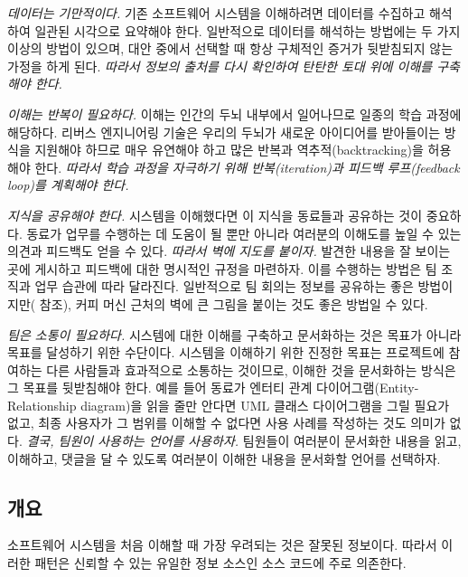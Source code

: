 \documentclass[a4paper,10pt,twoside]{book}
\begin{document}
\begin{bulletlist}
\item \emph{데이터는 기만적이다.}
기존 소프트웨어 시스템을 이해하려면 데이터를 수집하고 해석하여 일관된 시각으로 요약해야 한다. 일반적으로 데이터를 해석하는 방법에는 두 가지 이상의 방법이 있으며, 대안 중에서 선택할 때 항상 구체적인 증거가 뒷받침되지 않는 가정을 하게 된다. \emph{따라서 정보의 출처를 다시 확인하여 탄탄한 토대 위에 이해를 구축해야 한다.}

\item \emph{이해는 반복이 필요하다.}
이해는 인간의 두뇌 내부에서 일어나므로 일종의 학습 과정에 해당하다. 리버스 엔지니어링 기술은 우리의 두뇌가 새로운 아이디어를 받아들이는 방식을 지원해야 하므로 매우 유연해야 하고 많은 반복과 역추적(backtracking)을 허용해야 한다. \emph{따라서 학습 과정을 자극하기 위해 반복(iteration)과 피드백 루프(feedback loop)를 계획해야 한다.}

\item \emph{지식을 공유해야 한다.}
시스템을 이해했다면 이 지식을 동료들과 공유하는 것이 중요하다. 동료가 업무를 수행하는 데 도움이 될 뿐만 아니라 여러분의 이해도를 높일 수 있는 의견과 피드백도 얻을 수 있다. \emph{따라서 벽에 지도를 붙이자.} 발견한 내용을 잘 보이는 곳에 게시하고 피드백에 대한 명시적인 규정을 마련하자. 이를 수행하는 방법은 팀 조직과 업무 습관에 따라 달라진다. 일반적으로 팀 회의는 정보를 공유하는 좋은 방법이지만( 참조), 커피 머신 근처의 벽에 큰 그림을 붙이는 것도 좋은 방법일 수 있다.

\item \emph{팀은 소통이 필요하다.}
시스템에 대한 이해를 구축하고 문서화하는 것은 목표가 아니라 목표를 달성하기 위한 수단이다. 시스템을 이해하기 위한 진정한 목표는 프로젝트에 참여하는 다른 사람들과 효과적으로 소통하는 것이므로, 이해한 것을 문서화하는 방식은 그 목표를 뒷받침해야 한다. 예를 들어 동료가 엔터티 관계 다이어그램(Entity-Relationship diagram)을 읽을 줄만 안다면 UML 클래스 다이어그램을 그릴 필요가 없고, 최종 사용자가 그 범위를 이해할 수 없다면 사용 사례를 작성하는 것도 의미가 없다. \emph{결국, 팀원이 사용하는 언어를 사용하자.} 팀원들이 여러분이 문서화한 내용을 읽고, 이해하고, 댓글을 달 수 있도록 여러분이 이해한 내용을 문서화할 언어를 선택하자.
\end{bulletlist}

\subsection*{개요}

소프트웨어 시스템을 처음 이해할 때 가장 우려되는 것은 잘못된 정보이다. 따라서 이러한 패턴은 신뢰할 수 있는 유일한 정보 소스인 소스 코드에 주로 의존한다.
\end{document}
